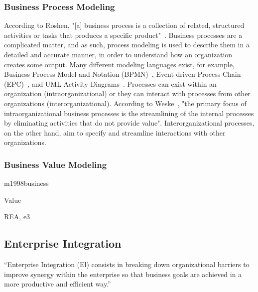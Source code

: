 \subsubsection{Business Process Modeling}

According to Roshen, "[a] business process is a collection of related, structured activities or tasks that produces a specific product"~\cite{roshen2009soa}. Business processes are a complicated matter, and as such, process modeling is used to describe them in a detailed and accurate manner, in order to understand how an organization creates some output. Many different modeling languages exist, for example, Business Process Model and Notation (BPMN)~\cite{model2011notation}, Event-driven Process Chain (EPC)~\cite[Ch. 6]{scheer2005process}, and UML Activity Diagrams~\cite{uml241}. Processes can exist within an organization (intraorganizational) or they can interact with processes from other organizations (interorganizational). According to Weske~\cite{weske2012business}, "the primary focus of intraorganizational business processes is the streamlining of the internal processes by eliminating activities that do not provide value". Interorganizational processes, on the other hand, aim to specify and streamline interactions with other organizations. 

\subsubsection{Business Value Modeling}

m1998business

Value 

REA, e3


\subsection{Enterprise Integration}

``Enterprise Integration (El) consists in breaking down organizational barriers to improve synergy within the enterprise so that business goals are achieved in a more productive and efficient way.''~\cite{Vernadat200215}

